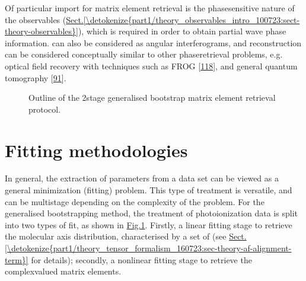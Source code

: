 \documentclass[letterpaper,table,10pt,english]{jupyterBook}
\begin{document}
\sphinxAtStartPar
Of particular import for matrix element retrieval is the phase\sphinxhyphen{}sensitive nature of the observables (\hyperref[\detokenize{part1/theory_observables_intro_100723:sect-theory-observables}]{Sect.\@ \ref{\detokenize{part1/theory_observables_intro_100723:sect-theory-observables}}}), which is required in order to obtain partial wave phase information. {\hyperref[\detokenize{backmatter/glossary:term-PADs}]{}} can also be considered as angular interferograms, and reconstruction can be considered conceptually similar to other phase\sphinxhyphen{}retrieval problems, e.g. optical field recovery with techniques such as FROG {[}\hyperlink{cite.backmatter/bibliography:id908}{118}{]}, and general quantum tomography {[}\hyperlink{cite.backmatter/bibliography:id764}{91}{]}.

\begin{figure}[htbp]
\centering
\capstart

\noindent{}
\caption{Outline of the 2\sphinxhyphen{}stage generalised bootstrap matrix element retrieval protocol.}\label{\detokenize{part1/numerics_070723:fig-bootstrap-fitting-diag}}\end{figure}


\section{Fitting methodologies}
\label{\detokenize{part1/numerics_070723:fitting-methodologies}}
\sphinxAtStartPar
In general, the extraction of parameters from a data set can be viewed as a general minimization (fitting) problem. This type of treatment is versatile, and can be multi\sphinxhyphen{}stage depending on the complexity of the problem. For the generalised bootstrapping method, the treatment of photoionization data is split into two types of fit, as shown in \hyperref[\detokenize{part1/numerics_070723:fig-bootstrap-fitting-diag}]{Fig.\@ \ref{\detokenize{part1/numerics_070723:fig-bootstrap-fitting-diag}}}. Firstly, a linear fitting stage to retrieve the molecular axis distribution, characterised by a set of {\hyperref[\detokenize{backmatter/glossary:term-ADMs}]{}} (see \hyperref[\detokenize{part1/theory_tensor_formalism_160723:sec-theory-af-alignment-term}]{Sect.\@ \ref{\detokenize{part1/theory_tensor_formalism_160723:sec-theory-af-alignment-term}}} for details); secondly, a non\sphinxhyphen{}linear fitting stage to retrieve the complex\sphinxhyphen{}valued matrix elements.
\end{document}
